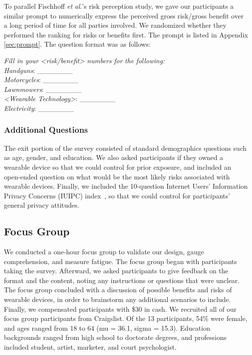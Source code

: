 \documentclass{acm_proc_article-sp}
\def\etal{{\it et al.~}}
\begin{document}

To parallel Fischhoff {\it et al.}'s risk perception study, we gave our participants a similar prompt to numerically express the perceived gross risk/gross benefit over a long period of time for all parties involved. We randomized whether they performed the ranking for risks or benefits first. The prompt is listed in Appendix \ref{sec:prompt}. The question format was as follows:

\textit{Fill in your <risk/benefit> numbers for the following:}\\[-.5cm]

\textit{Handguns}: \_\_\_\_\_\_\_ \\
\textit{Motorcycles}: \_\_\_\_\_\_\_\\
\textit{Lawnmowers}: \_\_\_\_\_\_\_\\
\textit{<Wearable Technology>}: \_\_\_\_\_\_\_\\
\textit{Electricity}: \_\_\_\_\_\_\_\\ [-.5cm]

\subsubsection{Additional Questions}
The exit portion of the survey consisted of standard demographics questions such as age, gender, and education. We also asked participants if they owned a wearable device so that we could control for prior exposure, and included an open-ended question on what would be the most likely risks associated with wearable devices. Finally, we included the 10-question Internet Users' Information Privacy Concerns (IUIPC) index~\cite{malhotra2004internet}, so that we could control for participants' general privacy attitudes.

\subsection{Focus Group}
We conducted a one-hour focus group to validate our design, gauge comprehension, and measure fatigue. The focus group began with participants taking the survey. Afterward, we asked participants to give feedback on the format and the content, noting any instructions or questions that were unclear. The focus group concluded with a discussion of possible benefits and risks of wearable devices, in order to brainstorm any additional scenarios to include. Finally, we compensated participants with \$30 in cash. We recruited all of our focus group participants from Craigslist. Of the 13 participants, 54\% were female, and ages ranged from 18 to 64 (mu = 36.1, sigma = 15.3).  Education backgrounds ranged from high school to doctorate degrees, and professions included student, artist, marketer, and court psychologist.
\end{document}
